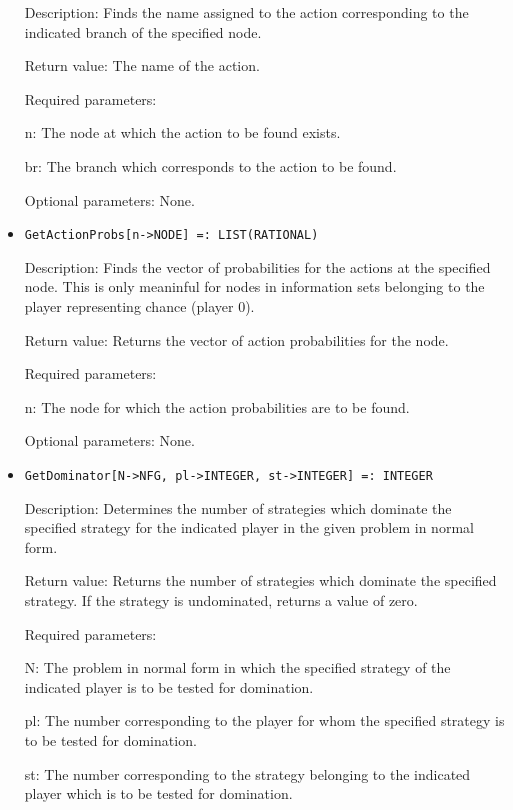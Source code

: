 \begin{itemize}
\bd
\item
[Description:] Finds the name assigned to the action corresponding to
the indicated branch of the specified node.
\item   
[Return value:] The name of the action.
\item
[Required parameters:]\hfil\null
	
\bd
\item
[n:] The node at which the action to be found exists.
\item
[br:] The branch which corresponds to the action to be found.
\ed

\item
[Optional parameters:] None.
\ed

\item
\protect \large \begin{verbatim}
GetActionProbs[n->NODE] =: LIST(RATIONAL)
\end{verbatim}\normalsize

\bd
\item
[Description:] Finds the vector of probabilities for the actions at
the specified node.  This is only meaninful for nodes in information
sets belonging to the player representing chance (player 0).
\item
[Return value:] Returns the vector of action probabilities for the
node.
\item
[Required parameters:]\hfil\null
	
\bd
\item
[n:] The node for which the action probabilities are to be found.
\ed

\item
[Optional parameters:] None.
\ed

\item
\protect \large \begin{verbatim}
GetDominator[N->NFG, pl->INTEGER, st->INTEGER] =: INTEGER
\end{verbatim}\normalsize

\bd
\item
[Description:] Determines the number of strategies which dominate the
specified strategy for the indicated player in the given problem in
normal form.
\item
[Return value:] Returns the number of strategies which dominate the
specified strategy.  If the strategy is undominated, returns a value
of zero.
\item
[Required parameters:]\hfil\null

\bd
\item
[N:] The problem in normal form in which the specified strategy of the
indicated player is to be tested for domination.
\item
[pl:] The number corresponding to the player for whom the specified
strategy is to be tested for domination.
\item
[st:] The number corresponding to the strategy belonging to the
indicated player which is to be tested for domination.
\ed


\end{itemize}
